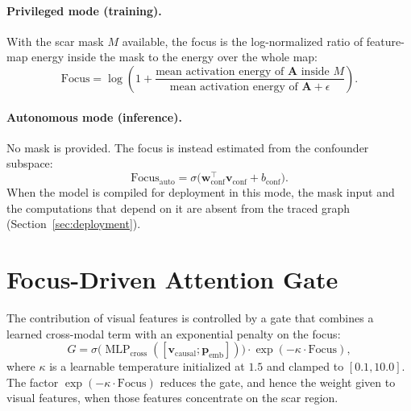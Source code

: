 \paragraph{Privileged mode (training).} With the scar mask $M$ available, the focus is the log-normalized ratio of feature-map energy inside the mask to the energy over the whole map:
\begin{equation}
\text{Focus} = \log\!\left(1 + \frac{\text{mean activation energy of } \mathbf{A} \text{ inside } M}{\text{mean activation energy of } \mathbf{A} + \epsilon}\right).
\end{equation}

\paragraph{Autonomous mode (inference).} No mask is provided. The focus is instead estimated from the confounder subspace:
\begin{equation}
\text{Focus}_{\text{auto}} = \sigma\bigl(\mathbf{w}_{\text{conf}}^{\top}\mathbf{v}_{\text{conf}} + b_{\text{conf}}\bigr).
\end{equation}
When the model is compiled for deployment in this mode, the mask input and the computations that depend on it are absent from the traced graph (Section~\ref{sec:deployment}).

\section{Focus-Driven Attention Gate}
The contribution of visual features is controlled by a gate that combines a learned cross-modal term with an exponential penalty on the focus:
\begin{equation}
G = \sigma\!\bigl(\operatorname{MLP}_{\text{cross}}([\mathbf{v}_{\text{causal}}; \mathbf{p}_{\text{emb}}])\bigr) \cdot \exp(-\kappa \cdot \text{Focus}),
\end{equation}
where $\kappa$ is a learnable temperature initialized at $1.5$ and clamped to $[0.1, 10.0]$. The factor $\exp(-\kappa \cdot \text{Focus})$ reduces the gate, and hence the weight given to visual features, when those features concentrate on the scar region.

